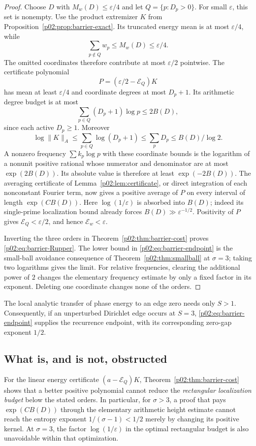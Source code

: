 \documentclass[11pt,letterpaper]{article}
\theoremstyle{definition}
\theoremstyle{remark}
\newcommand{\1}{\mathbf 1}
\begin{document}
\begin{proof}
Choose $D$ with $M_w(D)\le\varepsilon/4$ and let
$Q=\{p:D_p>0\}$. For small $\varepsilon$, this set is nonempty.
Use the product extremizer $K$ from Proposition~\ref{p02:prop:barrier-exact}.
Its truncated energy mean is at most $\varepsilon/4$, while
\[
 \sum_{p\notin Q}w_p\le M_w(D)\le\varepsilon/4.
\]
The omitted coordinates therefore contribute at most $\varepsilon/2$
pointwise. The certificate polynomial
\[
 P=(\varepsilon/2-\mathcal E_Q)K
\]
has mean at least $\varepsilon/4$ and coordinate degrees at most
$D_p+1$. Its arithmetic degree budget is at most
\[
 \sum_{p\in Q}(D_p+1)\log p\le2B(D),
\]
since each active $D_p\ge1$. Moreover
\[
 \log\|K\|_A
 \le\sum_{p\in Q}\log(D_p+1)
 \le\sum_pD_p\le B(D)/\log2.
\]
A nonzero frequency $\sum k_p\log p$ with these coordinate bounds is
the logarithm of a nonunit positive rational whose numerator and
denominator are at most $\exp(2B(D))$. Its absolute value is therefore
at least $\exp(-2B(D))$. The averaging certificate of
Lemma~\ref{p02:lem:certificate}, or direct integration of each nonconstant
Fourier term, now gives a positive average of $P$ on every interval of
length $\exp(CB(D))$. Here $\log(1/\varepsilon)$ is absorbed into
$B(D)$; indeed its single-prime localization bound already forces
$B(D)\gg\varepsilon^{-1/2}$. Positivity of $P$ gives
$\mathcal E_Q<\varepsilon/2$, and hence $\mathcal E_w<\varepsilon$.

Inverting the three orders in Theorem~\ref{p02:thm:barrier-cost} proves
\eqref{p02:eq:barrier-Rupper}. The lower bound in
\eqref{p02:eq:barrier-endpoint} is the small-ball avoidance consequence of
Theorem~\ref{p02:thm:smallball} at $\sigma=3$; taking two logarithms gives
the limit. For relative frequencies, clearing the additional power of
$2$ changes the elementary frequency estimate by only a fixed factor
in its exponent. Deleting one coordinate changes none of the orders.
\end{proof}

The local analytic transfer of phase energy to an edge zero needs only
$S>1$. Consequently, if an unperturbed Dirichlet edge occurs at $S=3$,
\eqref{p02:eq:barrier-endpoint} supplies the recurrence endpoint, with its corresponding zero-gap exponent $1/2$.

\subsection{What is, and is not, obstructed}

For the linear energy certificate $(a-\mathcal E_Q)K$,
Theorem~\ref{p02:thm:barrier-cost} shows that a better positive polynomial
cannot reduce the \emph{rectangular localization budget} below the
stated orders. In particular, for $\sigma>3$, a proof that pays
$\exp(CB(D))$ through the elementary arithmetic height estimate cannot
reach the entropy exponent $1/(\sigma-1)<1/2$ merely by changing its
positive kernel. At $\sigma=3$, the factor $\log(1/\varepsilon)$ in the
optimal rectangular budget is also unavoidable within that optimization.
\end{document}
